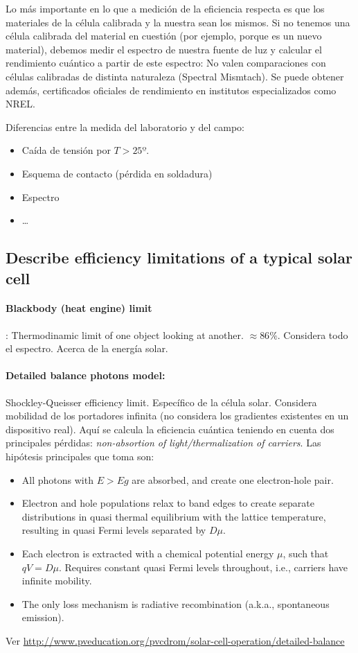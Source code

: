 Lo más importante en lo que a medición de la eficiencia respecta es que los materiales de la célula calibrada y la nuestra sean los mismos. Si no tenemos una célula calibrada del material en cuestión (por ejemplo, porque es un nuevo material), debemos medir el espectro de nuestra fuente de luz y calcular el rendimiento cuántico a partir de este espectro: No valen comparaciones con células calibradas de distinta naturaleza (Spectral Mismtach). Se puede obtener además, certificados oficiales de rendimiento en institutos especializados como NREL.

Diferencias entre la medida del laboratorio y del campo:
\begin{itemize}
	\item Caída de tensión por $T > 25º $.
	\item Esquema de contacto (pérdida en soldadura)
	\item Espectro
	\item \dots
\end{itemize}

\subsection{Describe efficiency limitations of a typical solar cell}
\paragraph{Blackbody (heat engine) limit}: Thermodinamic limit of one object looking at another. $ \approx 86 \% $. Considera todo el espectro. Acerca de la energía solar.
\paragraph{Detailed balance photons model:} Shockley-Queisser efficiency limit. Específico de la célula solar. Considera mobilidad de los portadores infinita (no considera los gradientes existentes en un dispositivo real). Aquí se calcula la eficiencia cuántica teniendo en cuenta dos principales pérdidas: {\em non-absortion of light/thermalization of carriers}. Las hipótesis principales que toma son: 
\begin{itemize}
\item All photons with $ E > Eg $ are absorbed, and create one electron-hole pair.
\item Electron and hole populations relax to band edges to create separate distributions in quasi thermal equilibrium with the lattice temperature, resulting in quasi Fermi levels separated by $ D\mu $.
\item Each electron is extracted with a chemical potential energy $ \mu $, such that $ qV = D\mu $. Requires constant quasi Fermi levels throughout, i.e., carriers have infinite mobility.
\item The only loss mechanism is radiative recombination (a.k.a., spontaneous emission).
\end{itemize}
Ver \url{http://www.pveducation.org/pvcdrom/solar-cell-operation/detailed-balance}
